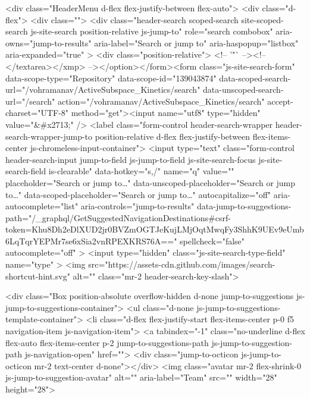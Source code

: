     <div class="HeaderMenu d-flex flex-justify-between flex-auto">
      <div class="d-flex">
            <div class="">
              <div class="header-search scoped-search site-scoped-search js-site-search position-relative js-jump-to"
  role="search combobox"
  aria-owns="jump-to-results"
  aria-label="Search or jump to"
  aria-haspopup="listbox"
  aria-expanded="true"
>
  <div class="position-relative">
    <!-- '"` --><!-- </textarea></xmp> --></option></form><form class="js-site-search-form" data-scope-type="Repository" data-scope-id="139043874" data-scoped-search-url="/vohramanav/ActiveSubspace_Kinetics/search" data-unscoped-search-url="/search" action="/vohramanav/ActiveSubspace_Kinetics/search" accept-charset="UTF-8" method="get"><input name="utf8" type="hidden" value="&#x2713;" />
      <label class="form-control header-search-wrapper header-search-wrapper-jump-to position-relative d-flex flex-justify-between flex-items-center js-chromeless-input-container">
        <input type="text"
          class="form-control header-search-input jump-to-field js-jump-to-field js-site-search-focus js-site-search-field is-clearable"
          data-hotkey="s,/"
          name="q"
          value=""
          placeholder="Search or jump to…"
          data-unscoped-placeholder="Search or jump to…"
          data-scoped-placeholder="Search or jump to…"
          autocapitalize="off"
          aria-autocomplete="list"
          aria-controls="jump-to-results"
          data-jump-to-suggestions-path="/_graphql/GetSuggestedNavigationDestinations#csrf-token=Khu8Dh2eDlXUD2jr0BVZmOGTJeKujLMjOqtMwqFy3ShhK9UEv9eUmb6LqTqrYEPMr7se6xSia2vnRPEXKRS76A=="
          spellcheck="false"
          autocomplete="off"
          >
          <input type="hidden" class="js-site-search-type-field" name="type" >
            <img src="https://assets-cdn.github.com/images/search-shortcut-hint.svg" alt="" class="mr-2 header-search-key-slash">

            <div class="Box position-absolute overflow-hidden d-none jump-to-suggestions js-jump-to-suggestions-container">
              <ul class="d-none js-jump-to-suggestions-template-container">
                <li class="d-flex flex-justify-start flex-items-center p-0 f5 navigation-item js-navigation-item">
                  <a tabindex="-1" class="no-underline d-flex flex-auto flex-items-center p-2 jump-to-suggestions-path js-jump-to-suggestion-path js-navigation-open" href="">
                    <div class="jump-to-octicon js-jump-to-octicon mr-2 text-center d-none"></div>
                    <img class="avatar mr-2 flex-shrink-0 js-jump-to-suggestion-avatar" alt="" aria-label="Team" src="" width="28" height="28">

